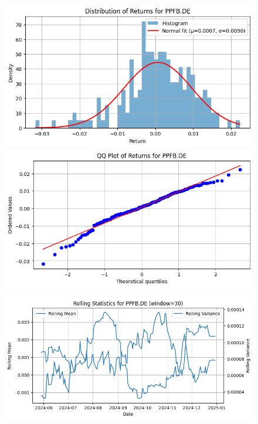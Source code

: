 \documentclass{article}%
\begin{document}
\begin{figure}[htbp]%
\begin{minipage}{0.49\textwidth}%
\includegraphics[width=\linewidth]{ticker_images/PPFB.DE_return_distribution.png}%
\end{minipage}%
\begin{minipage}{0.49\textwidth}%
\includegraphics[width=\linewidth]{ticker_images/PPFB.DE_qq_plot.png}%
\end{minipage}%
\end{figure}

%


\begin{figure}[htbp]%
\begin{minipage}{0.49\textwidth}%
\includegraphics[width=\linewidth]{ticker_images/PPFB.DE_rolling_stats.png}%
\end{minipage}%
\end{figure}
\end{document}
